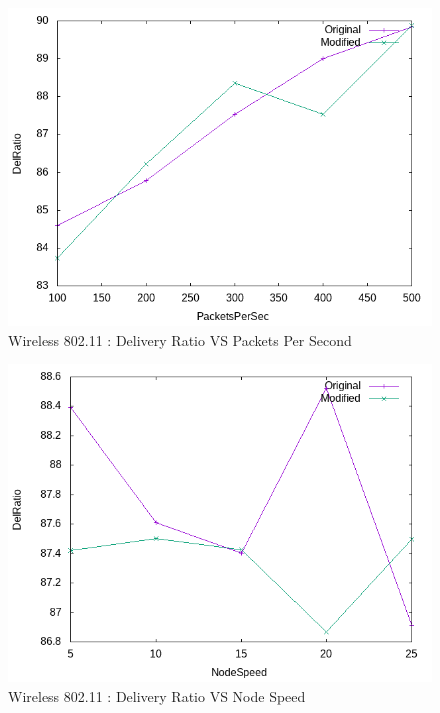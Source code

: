     \begin{figure}[!h] 
        \centering
        \includegraphics[width=.9\textwidth]{Pictures/Wireless802.11Mobile/Combined/DelRatioVSPacketsPerSec.png}
         \caption{Wireless 802.11 : Delivery Ratio VS Packets Per Second}
    \end{figure}
    
    \begin{figure}[!h] 
        \centering
        \includegraphics[width=.9\textwidth]{Pictures/Wireless802.11Mobile/Combined/DelRatioVSNodeSpeed.png}
         \caption{Wireless 802.11 : Delivery Ratio VS Node Speed}
    \end{figure}
    
\newpage
